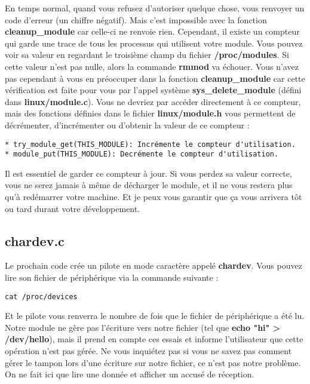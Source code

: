\documentclass[11pt]{article}
\begin{document}
En temps normal, quand vous refusez d'autoriser quelque chose, vous renvoyer un code d'erreur (un chiffre négatif). Mais c'est impossible avec la fonction \textbf{cleanup\_module} car celle-ci ne renvoie rien. Cependant, il existe un compteur qui garde une trace de tous les processus qui utilisent votre module. Vous pouvez voir sa valeur en regardant le troisième champ du fichier \textbf{/proc/modules}. Si cette valeur n'est pas nulle, alors la commande \textbf{rmmod} va échouer. Vous n'avez pas cependant à vous en préoccuper dans la fonction \textbf{cleanup\_module} car cette vérification est faite pour vous par l'appel système \textbf{sys\_delete\_module} (défini dans \textbf{linux/module.c}). Vous ne devriez par accéder directement à ce compteur, mais des fonctions définies dans le fichier \textbf{linux/module.h} vous permettent de décrémenter, d'incrémenter ou d'obtenir la valeur de ce compteur :

\begin{verbatim}
* try_module_get(THIS_MODULE): Incrémente le compteur d'utilisation.
* module_put(THIS_MODULE): Decrémente le compteur d'utilisation.
\end{verbatim}

Il est essentiel de garder ce compteur à jour. Si vous perdez sa valeur correcte, vous ne serez jamais à même de décharger le module, et il ne vous restera plus qu'à redémarrer votre machine. Et je peux vous garantir que ça vous arrivera tôt ou tard durant votre développement.

\subsection*{chardev.c}
\label{sec-6-5}

Le prochain code crée un pilote en mode caractère appelé \textbf{chardev}.
Vous pouvez lire son fichier de périphérique via la commande suivante :

\begin{verbatim}
cat /proc/devices
\end{verbatim}

Et le pilote vous renverra le nombre de fois que le fichier de périphérique a été lu. Notre module ne gère pas l'écriture vers notre fichier (tel que \textbf{echo "hi" > /dev/hello}), mais il prend en compte ces essais et informe l'utilisateur que cette opération n'est pas gérée. Ne vous inquiétez pas si vous ne savez pas comment gérer le tampon lors d'une écriture sur notre fichier, ce n'est pas notre problème. On ne fait ici que lire une donnée et afficher un accusé de réception.
\end{document}
